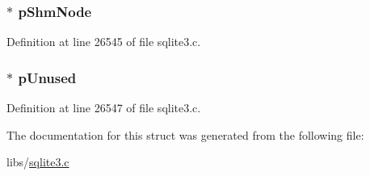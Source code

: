 \hypertarget{structunix_inode_info_a33d94caf6216ac0179eaf8fc02bc0237}{}
\subsubsection[{p\+Shm\+Node}]{$\ast$ p\+Shm\+Node}\label{structunix_inode_info_a33d94caf6216ac0179eaf8fc02bc0237}


Definition at line 26545 of file sqlite3.\+c.

\hypertarget{structunix_inode_info_a7ecad57bed967765906dd7d10af97be1}{}
\subsubsection[{p\+Unused}]{$\ast$ p\+Unused}\label{structunix_inode_info_a7ecad57bed967765906dd7d10af97be1}


Definition at line 26547 of file sqlite3.\+c.



The documentation for this struct was generated from the following file\+:\begin{DoxyCompactItemize}
\item 
libs/\hyperlink{sqlite3_8c}{sqlite3.\+c}\end{DoxyCompactItemize}
